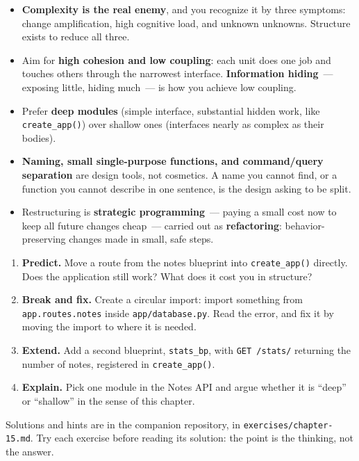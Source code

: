 \begin{takeaways}
\begin{itemize}
\item
  \textbf{Complexity is the real enemy}, and you recognize it by three symptoms: change amplification, high cognitive load, and unknown unknowns. Structure exists to reduce all three.
\item
  Aim for \textbf{high cohesion and low coupling}: each unit does one job and touches others through the narrowest interface. \textbf{Information hiding}~--- exposing little, hiding much~--- is how you achieve low coupling.
\item
  Prefer \textbf{deep modules} (simple interface, substantial hidden work, like \texttt{create\_app()}) over shallow ones (interfaces nearly as complex as their bodies).
\item
  \textbf{Naming, small single-purpose functions, and command/query separation} are design tools, not cosmetics. A name you cannot find, or a function you cannot describe in one sentence, is the design asking to be split.
\item
  Restructuring is \textbf{strategic programming}~--- paying a small cost now to keep all future changes cheap~--- carried out as \textbf{refactoring}: behavior-preserving changes made in small, safe steps.
\end{itemize}

\end{takeaways}

\label{15-structuring-the-application:exercises}

\begin{enumerate}
\def\labelenumi{\arabic{enumi}.}
\tightlist
\item
  \textbf{Predict.} Move a route from the notes blueprint into \texttt{create\_app()} directly. Does the application still work? What does it cost you in structure?
\item
  \textbf{Break and fix.} Create a circular import: import something from \texttt{app.routes.notes} inside \texttt{app/database.py}. Read the error, and fix it by moving the import to where it is needed.
\item
  \textbf{Extend.} Add a second blueprint, \texttt{stats\_bp}, with \texttt{GET\ /stats/} returning the number of notes, registered in \texttt{create\_app()}.
\item
  \textbf{Explain.} Pick one module in the Notes API and argue whether it is ``deep'' or ``shallow'' in the sense of this chapter.
\end{enumerate}

\noindent{}Solutions and hints are in the companion repository, in \texttt{exercises/}\allowbreak{}\texttt{chapter-15.md}. Try each exercise before reading its solution: the point is the thinking, not the answer.


